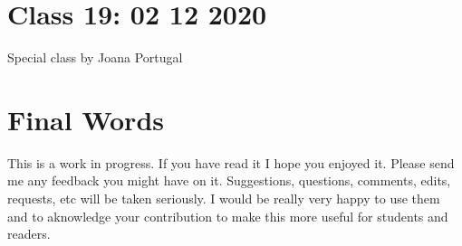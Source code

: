 \documentclass[
]{book}
\begin{document}
\hypertarget{aula19}{%
\chapter{Class 19: 02 12 2020}\label{aula19}}

Special class by Joana Portugal

\hypertarget{final-words}{%
\chapter{Final Words}\label{final-words}}

This is a work in progress. If you have read it I hope you enjoyed it. Please send me any feedback you might have on it. Suggestions, questions, comments, edits, requests, etc will be taken seriously. I would be really very happy to use them and to aknowledge your contribution to make this more useful for students and readers.

  
\end{document}
